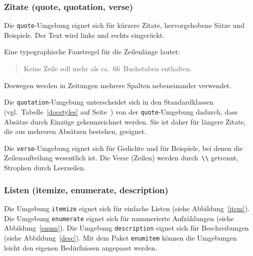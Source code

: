 \subsubsection{Zitate (quote, quotation, verse)}

Die \texttt{quote}-Umgebung eignet sich für kürzere Zitate,
hervorgehobene Sätze und Beispiele.
Der Text wird links und rechts eingerückt.
%
\begin{LTXexample}
Eine typographische Faustregel
für die Zeilenlänge lautet:
\begin{quote}
Keine Zeile soll mehr als
ca.\ 66~Buchstaben enthalten.
\end{quote}
Deswegen werden in Zeitungen
mehrere Spalten nebeneinander
verwendet.
\end{LTXexample}

Die \texttt{quotation}-Umgebung unterscheidet sich in den
Standardklassen (vgl.\ Tabelle~\ref{docstyles} auf
Seite~\pageref{docstyles}) von der \texttt{quote}-Umgebung
dadurch, dass Absätze durch Einzüge gekennzeichnet werden.
Sie ist daher für längere Zitate, die aus mehreren Absätzen
bestehen, geeignet.

Die \texttt{verse}-Umgebung eignet sich für Gedichte und für
Beispiele, bei denen die Zeilenaufteilung wesentlich ist.  Die
Verse (Zeilen) werden durch~\lstinline|\\| getrennt, Strophen durch
Leerzeilen.


\subsubsection{Listen (itemize, enumerate, description)}
Die Umgebung \texttt{itemize} eignet sich für einfache Listen
(siehe Abbildung~\vref{item}).
Die Umgebung \texttt{enumerate} eignet sich für nummerierte
Aufzählungen (siehe Abbildung~\vref{enum}).
Die Umgebung \texttt{description} eignet sich für Beschreibungen
(siehe Abbildung~\vref{desc}). Mit dem Paket \texttt{enumitem} können die Umgebungen leicht den eigenen Bedürfnissen angepasst werden.

